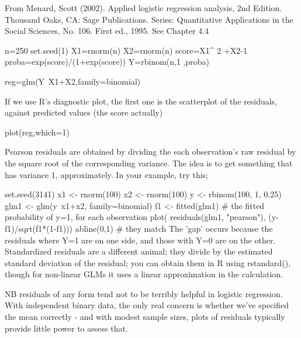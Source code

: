 From Menard, Scott (2002). Applied logistic regression analysis, 2nd Edition. Thousand Oaks, CA: Sage Publications. Series: Quantitative Applications in the Social Sciences, No. 106. First ed., 1995. See Chapter 4.4


n=250
set.seed(1)
X1=rnorm(n)
X2=rnorm(n)
score=X1^ 2 +X2-1
proba=exp(score)/(1+exp(score))
Y=rbinom(n,1 ,proba)

reg=glm(Y~X1+X2,family=binomial)


If we use R’s diagnostic plot, the first one is the scatterplot of the residuals, against predicted values (the score actually)

plot(reg,which=1)





Pearson residuals are obtained by dividing the each observation's raw residual by the square root of the corresponding variance. The idea is to get something that has variance 1, approximately. In your example, try this;

set.seed(3141)
x1 <- rnorm(100)
x2 <- rnorm(100)
y <- rbinom(100, 1, 0.25)
glm1 <- glm(y~x1+x2, family=binomial)
f1 <- fitted(glm1) # the fitted probability of y=1, for each observation
plot( residuals(glm1, "pearson"), (y-f1)/sqrt(f1*(1-f1)))
abline(0,1)        # they match
The 'gap' occurs because the residuals where Y=1 are on one side, and those with Y=0 are on the other. Standardized residuals are a different animal; they divide by the estimated standard deviation of the residual; you can obtain them in R using rstandard(), though for non-linear GLMs it uses a linear approximation in the calculation.

NB residuals of any form tend not to be terribly helpful in logistic regression. With independent binary data, the only real concern is whether we've specified the mean correctly - and with modest sample sizes, plots of residuals typically provide little power to assess that.
